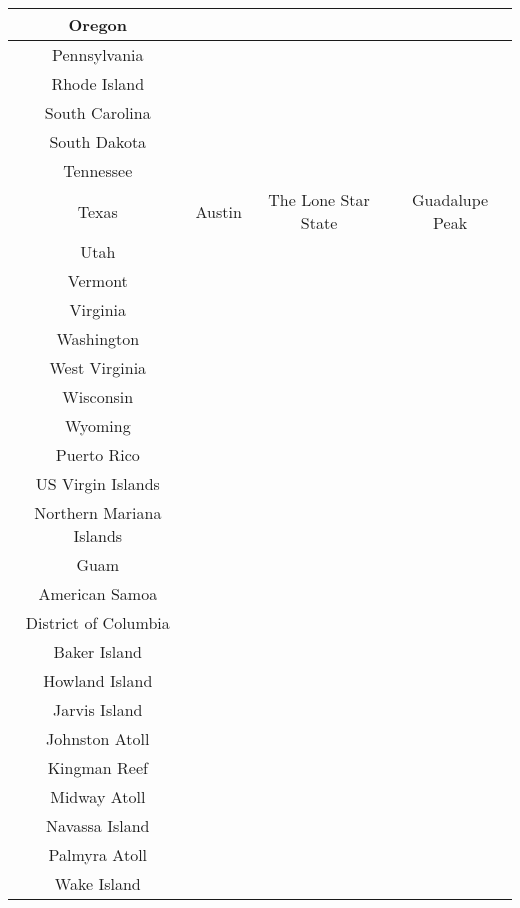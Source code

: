 		 \begin{tabular}{|c|c|c|c|}
				 \hline
				 Oregon 	& & &  \\
				 \hline
				 Pennsylvania 	& & &  \\
				 \hline
				 Rhode Island 	& & &  \\
				 \hline
				 South Carolina 	& & &  \\
				 \hline
				 South Dakota 	& & &  \\
				 \hline
				 Tennessee 	& & &  \\
				 \hline
				 Texas 	& Austin & The Lone Star State & Guadalupe Peak \\
				 \hline
				 Utah 	& & &  \\
				 \hline
				 Vermont 	& & &  \\
				 \hline
				 Virginia 	& & &  \\
				 \hline
				 Washington 	& & &  \\
				 \hline
				 West Virginia 	& & &  \\
				 \hline
				 Wisconsin 	& & &  \\
				 \hline
				 Wyoming 	& & &  \\
				 \hline
				 Puerto Rico	& & &  \\
				 \hline
				 US Virgin Islands	& & &  \\
				 \hline
				 Northern Mariana Islands	& & &  \\
				 \hline
				 Guam	& & &  \\
				 \hline
				 American Samoa	& & &  \\
				 \hline
				 District of Columbia	& & &  \\
				 \hline
				 Baker Island 	& & &  \\
				 \hline
				 Howland Island 	& & &  \\
				 \hline
				 Jarvis Island 	& & &  \\
				 \hline
				 Johnston Atoll 	& & &  \\
				 \hline
				 Kingman Reef 	& & &  \\
				 \hline
				 Midway Atoll 	& & &  \\
				 \hline
				 Navassa Island 	& & &  \\
				 \hline
				 Palmyra Atoll 	& & &  \\
				 \hline
				 Wake Island	& & &  \\
				 \hline
				 
				 
			\end{tabular}
			

